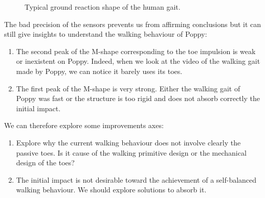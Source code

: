 \begin{figure}[!ht]
\centering
    \hfill
    \caption{Typical ground reaction shape of the human gait.}
    \label{fig:human_GRF}
\end{figure}


The bad precision of the sensors prevents us from affirming conclusions but it can still give insights to understand the walking behaviour of Poppy:
\begin{enumerate}
    \item The second peak of the M-shape corresponding to the toe impulsion is weak or inexistent on Poppy. Indeed, when we look at the video of the walking gait made by Poppy, we can notice it barely uses its toes.
    \item The first peak of the M-shape is very strong. Either the walking gait of Poppy was fast or the structure is too rigid and does not absorb correctly the initial impact.
\end{enumerate}

We can therefore explore some improvements axes:
\begin{enumerate}
    \item Explore why the current walking behaviour does not involve clearly the passive toes. Is it cause of the walking primitive design or the mechanical design of the toes?
    \item The initial impact is not desirable toward the achievement of a self-balanced walking behaviour. We should explore solutions to absorb it.
\end{enumerate}

